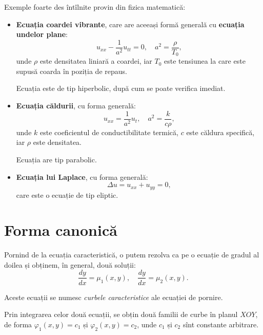 Exemple foarte des întîlnite provin din fizica matematică:
\begin{itemize}
    \item \textbf{Ecuația coardei vibrante}, care are aceeași formă generală
        cu \textbf{ecuația undelor plane}:  
        \[
            u_{xx} - \dfrac{1}{a^2} u_{tt} = 0, \quad a^2 = \dfrac{\rho}{T_0},
        \]
        unde $ \rho $ este densitatea liniară a coardei, iar $ T_0 $ este tensiunea
        la care este supusă coarda în poziția de repaus.

        Ecuația este de tip hiperbolic, după cum se poate verifica imediat.
    \item \textbf{Ecuația căldurii}, cu forma generală: 
        \[
            u_{xx} = \dfrac{1}{a^2} u_t, \quad a^2 = \dfrac{k}{c \rho},
        \]
        unde $ k $ este coeficientul de conductibilitate termică, $ c $ este
        căldura specifică, iar $ \rho $ este densitatea.

        Ecuația are tip parabolic.
    \item \textbf{Ecuația lui Laplace}, cu forma generală: 
        \[
            \Delta u = u_{xx} + u_{yy} = 0,
        \]
        care este o ecuație de tip eliptic.
\end{itemize}


\section{Forma canonică}

Pornind de la ecuația caracteristică, o putem rezolva ca pe o ecuație de gradul
al doilea și obținem, în general, două soluții:
\[
    \dfrac{dy}{dx} = \mu_1(x, y), \quad \dfrac{dy}{dx} = \mu_2(x, y).
\]

Aceste ecuații se numesc \emph{curbele caracteristice} ale ecuației de pornire.

Prin integrarea celor două ecuații, se obțin două familii de curbe în planul
$ XOY $, de forma $ \varphi_1(x, y) = c_1 $ și $ \varphi_2(x, y) = c_2 $, unde
$ c_1 $ și $ c_2 $ sînt constante arbitrare.


